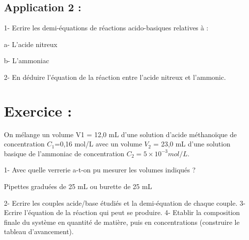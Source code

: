 \documentclass[12pt]{article}
\begin{document}
\subsection{Application 2 :}
1- Ecrire les demi-équations de réactions acido-basiques relatives à :

a- L’acide nitreux 

b- L’ammoniac 

2- En déduire l’équation de la réaction entre l’acide nitreux et l’ammonic.
\section{Exercice : }

On mélange un volume V1 = 12,0 mL d’une solution d’acide méthanoïque 
de concentration $C_1$=0,16 mol/L avec un volume $V_2$ = 23,0 mL d’une solution basique
de l’ammoniac  de concentration $C_2 = 5 × 10^{-3}mol/L$.

1- Avec quelle verrerie a-t-on pu mesurer les volumes indiqués ?

Pipettes graduées de 25 mL ou burette de 25 mL

2- Ecrire les couples acide/base étudiés et la demi-équation de chaque couple.
3- Ecrire l’équation de la réaction qui peut se produire.
4- Etablir la composition finale du système en quantité de matière, puis en
concentrations (construire le tableau d’avancement).
\end{document}
